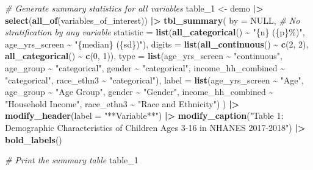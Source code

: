 \documentclass[
]{article}
\newenvironment{Shaded}{\begin{snugshade}}{\end{snugshade}}
\newcommand{\AttributeTok}[1]{\textcolor[rgb]{0.13,0.29,0.53}{#1}}
\newcommand{\CommentTok}[1]{\textcolor[rgb]{0.56,0.35,0.01}{\textit{#1}}}
\newcommand{\ConstantTok}[1]{\textcolor[rgb]{0.56,0.35,0.01}{#1}}
\newcommand{\DecValTok}[1]{\textcolor[rgb]{0.00,0.00,0.81}{#1}}
\newcommand{\FunctionTok}[1]{\textcolor[rgb]{0.13,0.29,0.53}{\textbf{#1}}}
\newcommand{\NormalTok}[1]{#1}
\newcommand{\OtherTok}[1]{\textcolor[rgb]{0.56,0.35,0.01}{#1}}
\newcommand{\SpecialCharTok}[1]{\textcolor[rgb]{0.81,0.36,0.00}{\textbf{#1}}}
\newcommand{\StringTok}[1]{\textcolor[rgb]{0.31,0.60,0.02}{#1}}
\begin{document}
\begin{Shaded}
\begin{Highlighting}[]
\CommentTok{\# Generate summary statistics for all variables}
\NormalTok{table\_1 }\OtherTok{\textless{}{-}}\NormalTok{ demo }\SpecialCharTok{|\textgreater{}} 
  \FunctionTok{select}\NormalTok{(}\FunctionTok{all\_of}\NormalTok{(variables\_of\_interest)) }\SpecialCharTok{|\textgreater{}} 
  \FunctionTok{tbl\_summary}\NormalTok{(}
    \AttributeTok{by =} \ConstantTok{NULL}\NormalTok{, }\CommentTok{\# No stratification by any variable}
    \AttributeTok{statistic =} \FunctionTok{list}\NormalTok{(}\FunctionTok{all\_categorical}\NormalTok{() }\SpecialCharTok{\textasciitilde{}} \StringTok{"\{n\} (\{p\}\%)"}\NormalTok{,}
\NormalTok{                     age\_yrs\_screen }\SpecialCharTok{\textasciitilde{}} \StringTok{"\{median\} (\{sd\})"}\NormalTok{),}
    \AttributeTok{digits =} \FunctionTok{list}\NormalTok{(}\FunctionTok{all\_continuous}\NormalTok{() }\SpecialCharTok{\textasciitilde{}} \FunctionTok{c}\NormalTok{(}\DecValTok{2}\NormalTok{, }\DecValTok{2}\NormalTok{),}
                  \FunctionTok{all\_categorical}\NormalTok{() }\SpecialCharTok{\textasciitilde{}} \FunctionTok{c}\NormalTok{(}\DecValTok{0}\NormalTok{, }\DecValTok{1}\NormalTok{)),}
    \AttributeTok{type =} \FunctionTok{list}\NormalTok{(age\_yrs\_screen }\SpecialCharTok{\textasciitilde{}} \StringTok{"continuous"}\NormalTok{,}
\NormalTok{                age\_group }\SpecialCharTok{\textasciitilde{}} \StringTok{"categorical"}\NormalTok{,}
\NormalTok{                gender }\SpecialCharTok{\textasciitilde{}} \StringTok{"categorical"}\NormalTok{,}
\NormalTok{                income\_hh\_combined }\SpecialCharTok{\textasciitilde{}} \StringTok{"categorical"}\NormalTok{,}
\NormalTok{                race\_ethn3 }\SpecialCharTok{\textasciitilde{}} \StringTok{"categorical"}\NormalTok{),}
    \AttributeTok{label =} \FunctionTok{list}\NormalTok{(age\_yrs\_screen }\SpecialCharTok{\textasciitilde{}} \StringTok{"Age"}\NormalTok{,}
\NormalTok{                 age\_group }\SpecialCharTok{\textasciitilde{}} \StringTok{"Age Group"}\NormalTok{,}
\NormalTok{                 gender }\SpecialCharTok{\textasciitilde{}} \StringTok{"Gender"}\NormalTok{,}
\NormalTok{                 income\_hh\_combined }\SpecialCharTok{\textasciitilde{}} \StringTok{"Household Income"}\NormalTok{,}
\NormalTok{                 race\_ethn3 }\SpecialCharTok{\textasciitilde{}} \StringTok{"Race and Ethnicity"}\NormalTok{)}
\NormalTok{  ) }\SpecialCharTok{|\textgreater{}} 
  \FunctionTok{modify\_header}\NormalTok{(}\AttributeTok{label =} \StringTok{"**Variable**"}\NormalTok{) }\SpecialCharTok{|\textgreater{}} 
  \FunctionTok{modify\_caption}\NormalTok{(}\StringTok{"Table 1: Demographic Characteristics of Children Ages 3{-}16 in NHANES 2017{-}2018"}\NormalTok{) }\SpecialCharTok{|\textgreater{}} 
  \FunctionTok{bold\_labels}\NormalTok{()}

\CommentTok{\# Print the summary table}
\NormalTok{table\_1}
\end{Highlighting}
\end{Shaded}
\end{document}

